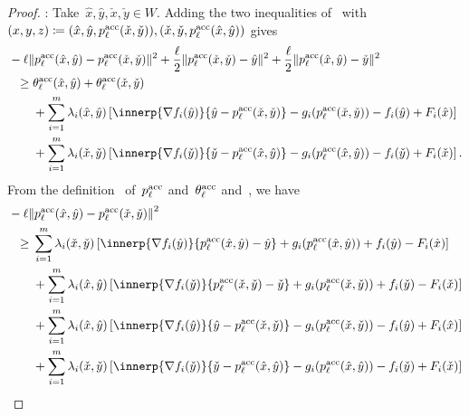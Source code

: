 \documentclass[../main]{subfiles}
\begin{document}
\begin{proof}
    :
    Take~$\hat{x}, \hat{y}, \check{x}, \check{y} \in W$.
    Adding the two inequalities of~ with~$(x, y, z) \coloneqq (\hat{x}, \hat{y}, p^{\mathrm{acc}}_\ell(\check{x}, \check{y})), (\check{x}, \check{y}, p^{\mathrm{acc}}_\ell(\hat{x}, \hat{y}))$ gives
    \begin{align}
        \MoveEqLeft - \ell \norm{p^\acc_\ell(\hat{x}, \hat{y}) - p^\acc_\ell(\check{x}, \check{y})}^2 + \frac{\ell}{2} \norm{p^\acc_\ell(\check{x}, \check{y}) - \hat{y}}^2 + \frac{\ell}{2} \norm{p^\acc_\ell(\hat{x}, \hat{y}) - \check{y}}^2 \\
        \ge{}& \theta^\acc_\ell(\hat{x}, \hat{y}) + \theta^\acc_\ell(\check{x}, \check{y}) \\
           &+ \sum_{i = 1}^{m} \lambda_i(\hat{x}, \hat{y}) \left[ \innerp{\nabla f_i(\hat{y})}{\hat{y} - p^\acc_\ell(\check{x}, \check{y})} - g_i(p^\acc_\ell(\check{x}, \check{y})) - f_i(\hat{y}) + F_i(\hat{x}) \right] \\
           &+ \sum_{i = 1}^{m} \lambda_i(\check{x}, \check{y}) \left[ \innerp{\nabla f_i(\check{y})}{\check{y} - p^\acc_\ell(\hat{x}, \hat{y})} - g_i(p^\acc_\ell(\hat{x}, \hat{y})) - f_i(\check{y}) + F_i(\check{x}) \right]  
    .\end{align}
    From the definition~ of~$p^{\mathrm{acc}}_\ell$ and~$\theta^{\mathrm{acc}}_\ell$ and~, we have
    \begin{align}
        \MoveEqLeft - \ell \norm*{p^\acc_\ell(\hat{x}, \hat{y}) - p^\acc_\ell(\check{x}, \check{y})}^2 \\
        \ge{}& \sum_{i = 1}^{m} \lambda_i(\check{x}, \check{y}) \left[ \innerp{\nabla f_i(\hat{y})}{p^\acc_\ell(\hat{x}, \hat{y}) - \hat{y}} + g_i(p^\acc_\ell(\hat{x}, \hat{y})) + f_i(\hat{y}) - F_i(\hat{x}) \right] \\ 
             &+ \sum_{i = 1}^{m} \lambda_i(\hat{x}, \hat{y}) \left[ \innerp{\nabla f_i(\check{y})}{p^\acc_\ell(\check{x}, \check{y}) - \check{y}} + g_i(p^\acc_\ell(\check{x}, \check{y})) + f_i(\check{y}) - F_i(\check{x}) \right] \\
             &+ \sum_{i = 1}^{m} \lambda_i(\hat{x}, \hat{y}) \left[ \innerp{\nabla f_i(\hat{y})}{\hat{y} - p^\acc_\ell(\check{x}, \check{y})} - g_i(p^\acc_\ell(\check{x}, \check{y})) - f_i(\hat{y}) + F_i(\hat{x}) \right] \\
             &+ \sum_{i = 1}^{m} \lambda_i(\check{x}, \check{y}) \left[ \innerp{\nabla f_i(\check{y})}{\check{y} - p^\acc_\ell(\hat{x}, \hat{y})} - g_i(p^\acc_\ell(\hat{x}, \hat{y})) - f_i(\check{y}) + F_i(\check{x}) \right] \\

\end{align}
\end{proof}
\end{document}
